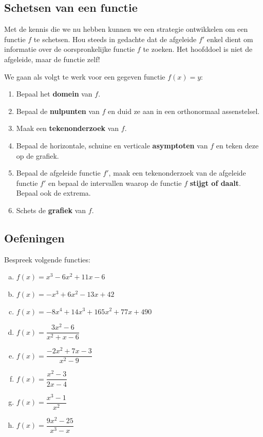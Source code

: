 \documentclass[12pt]{article}
\begin{document}
\subsection{Schetsen van een functie}

Met de kennis die we nu hebben kunnen we een strategie ontwikkelen om een functie $f$ te schetsen. Hou steeds in gedachte dat de afgeleide $f'$ enkel dient om informatie over de oorspronkelijke functie $f$ te zoeken. Het hoofddoel is niet de afgeleide, maar de functie zelf!

We gaan als volgt te werk voor een gegeven functie $f(x)=y$:
\begin{enumerate}
\item Bepaal het {\bf domein} van $f$.
\item Bepaal de {\bf nulpunten} van $f$ en duid ze aan in een orthonormaal assenstelsel.
\item Maak een {\bf tekenonderzoek} van $f$.
\item Bepaal de horizontale, schuine en verticale {\bf asymptoten} van $f$ en teken deze op de grafiek.
\item Bepaal de afgeleide functie $f'$, maak een tekenonderzoek van de afgeleide functie $f'$ en bepaal de intervallen waarop de functie $f$ {\bf stijgt of daalt}. Bepaal ook de extrema.
\item Schets de {\bf grafiek} van $f$.
\end{enumerate}

\subsection{Oefeningen}

\begin{oefening}
  Bespreek volgende functies:
  \begin{multicols}{2}
  \begin{enumerate}[(a)]
  \itemsep.75em
  \item $f(x)=x^3-6x^2+11x-6$
  \item $f(x)=-x^3+6x^2-13x+42$
  \item $f(x)=-8x^4+14x^3+165x^2+77x+490$
  \item $f(x)=\dfrac{3x^2-6}{x^2+x-6}$
  \item $f(x)=\dfrac{-2x^2+7x-3}{x^2-9}$
  \item $f(x)=\dfrac{x^2-3}{2x-4}$
  \item $f(x)=\dfrac{x^3-1}{x^2}$
  \item $f(x)=\dfrac{9x^2-25}{x^3-x}$
  \end{enumerate}
  \end{multicols}
\end{oefening}
\end{document}
